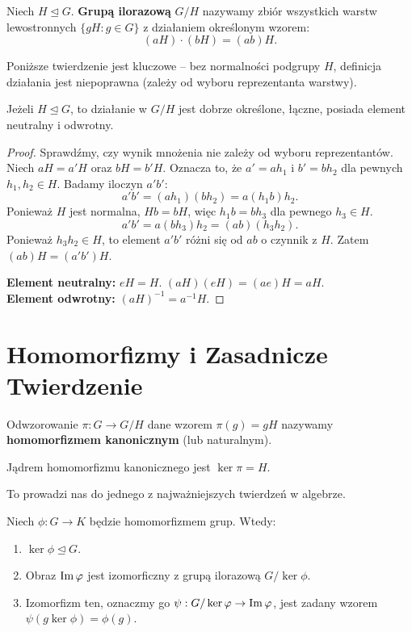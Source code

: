 \begin{definition}
Niech $H \trianglelefteq G$. \textbf{Grupą ilorazową} $G/H$ nazywamy zbiór wszystkich warstw lewostronnych $\{gH : g \in G\}$ z działaniem określonym wzorem:
\[ (aH) \cdot (bH) = (ab)H. \]
\end{definition}

Poniższe twierdzenie jest kluczowe – bez normalności podgrupy $H$, definicja działania jest niepoprawna (zależy od wyboru reprezentanta warstwy).

\begin{theorem}
Jeżeli $H \trianglelefteq G$, to działanie w $G/H$ jest dobrze określone, łączne, posiada element neutralny i odwrotny.
\end{theorem}

\begin{proof}
Sprawdźmy, czy wynik mnożenia nie zależy od wyboru reprezentantów.
Niech $aH = a'H$ oraz $bH = b'H$. Oznacza to, że $a' = ah_1$ i $b' = bh_2$ dla pewnych $h_1, h_2 \in H$.
Badamy iloczyn $a'b'$:
\[ a'b' = (ah_1)(bh_2) = a(h_1b)h_2. \]
Ponieważ $H$ jest normalna, $Hb = bH$, więc $h_1b = bh_3$ dla pewnego $h_3 \in H$.
\[ a'b' = a(bh_3)h_2 = (ab)(h_3h_2). \]
Ponieważ $h_3h_2 \in H$, to element $a'b'$ różni się od $ab$ o czynnik z $H$.
Zatem $(ab)H = (a'b')H$.

\noindent \textbf{Element neutralny:} $eH = H$. $(aH)(eH) = (ae)H = aH$. \\
\noindent \textbf{Element odwrotny:} $(aH)^{-1} = a^{-1}H$.
\end{proof}

\section{Homomorfizmy i Zasadnicze Twierdzenie}

\begin{definition}
Odwzorowanie $\pi: G \to G/H$ dane wzorem $\pi(g) = gH$ nazywamy \textbf{homomorfizmem kanonicznym} (lub naturalnym).
\end{definition}

\begin{fact}
Jądrem homomorfizmu kanonicznego jest $\ker \pi = H$.
\end{fact}

To prowadzi nas do jednego z najważniejszych twierdzeń w algebrze.

\begin{theorem}
Niech $\phi: G \to K$ będzie homomorfizmem grup. Wtedy:
\begin{enumerate}
    \item $\ker \phi \trianglelefteq G$.
    \item Obraz $\operatorname{Im} \varphi$ jest izomorficzny z grupą ilorazową $G / \ker \phi$.
    \item Izomorfizm ten, oznaczmy go $\psi: G/\ker \varphi \to \operatorname{Im} \varphi$, jest zadany wzorem $\psi(g \ker \phi) = \phi(g)$.
\end{enumerate}
\end{theorem}

